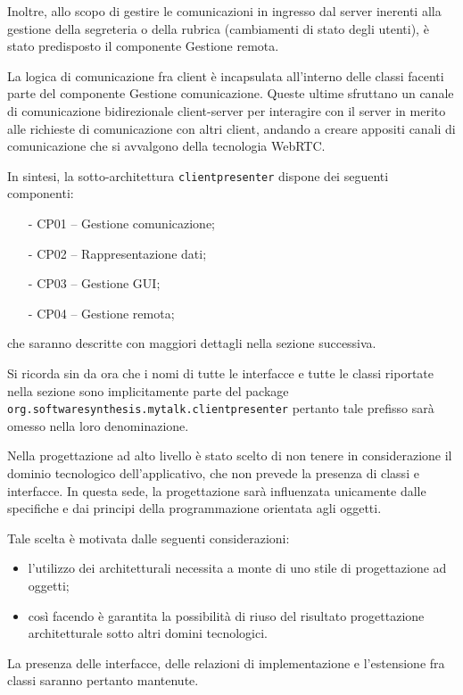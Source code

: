 Inoltre, allo scopo di gestire le comunicazioni in ingresso dal server inerenti alla gestione della segreteria o della rubrica (cambiamenti di stato degli utenti), è stato predisposto il componente \textsf{Gestione remota}.

La logica di comunicazione fra client è incapsulata all'interno delle classi facenti parte del componente \textsf{Gestione comunicazione}. Queste ultime sfruttano un canale di comunicazione bidirezionale client-server per interagire con il server in merito alle richieste di comunicazione con altri client, andando a creare appositi canali di comunicazione che si avvalgono della tecnologia WebRTC\@.

In sintesi, la sotto-architettura \texttt{clientpresenter} dispone dei seguenti componenti:
\begin{itemize}[noitemsep,nolistsep]
	\item[-] \textsf{CP01 -- Gestione comunicazione};
	\item[-] \textsf{CP02 -- Rappresentazione dati};
	\item[-] \textsf{CP03 -- Gestione GUI};
	\item[-] \textsf{CP04 -- Gestione remota};
\end{itemize}
che saranno descritte con maggiori dettagli nella sezione successiva.

Si ricorda sin da ora che i nomi di tutte le interfacce e tutte le classi riportate nella sezione sono implicitamente parte del package \texttt{org.softwaresynthesis.mytalk.clientpresenter} pertanto tale prefisso sarà omesso nella loro denominazione.

Nella progettazione ad alto livello è stato scelto di non tenere in considerazione il dominio tecnologico dell'applicativo, che non prevede la presenza di classi e interfacce. In questa sede, la progettazione sarà influenzata unicamente dalle specifiche e dai principi della programmazione orientata agli oggetti.

Tale scelta è motivata dalle seguenti considerazioni:
\begin{itemize}
   \item l'utilizzo dei  architetturali necessita a monte di uno stile di progettazione ad oggetti;
   \item così facendo è garantita la possibilità di riuso del risultato progettazione architetturale sotto altri domini tecnologici.
\end{itemize}

La presenza delle interfacce, delle relazioni di implementazione e l'estensione fra classi saranno pertanto mantenute.

